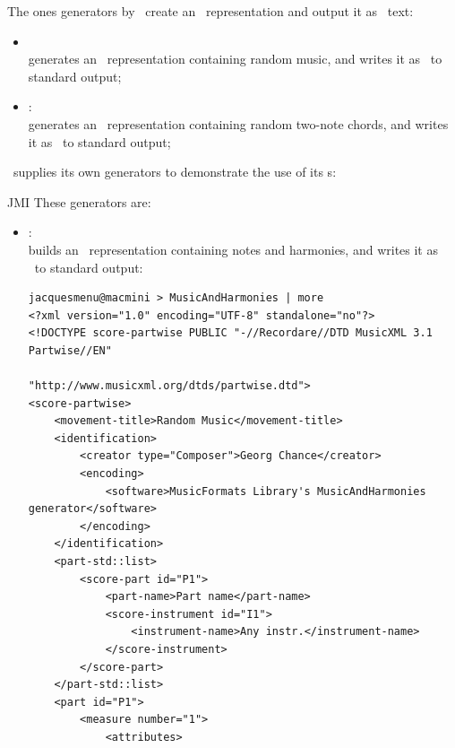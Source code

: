 The ones generators by \libmusicxml\ create an \mxsrRepr\ representation and output it as \mxml\ text:
\begin{itemize}
\item {} \\
generates an \mxsrRepr\ representation containing random music, and writes it as \mxml\ to standard output;

\item {}:\\
generates an \mxsrRepr\ representation containing random two-note chords, and writes it as \mxml\ to standard output;
\end{itemize}

\mf\ supplies its own generators to demonstrate the use of its \API s:
%
\begin{itemize}JMI
%
These generators are:
\begin{itemize}
\item {}: \\
builds an \mxsrRepr\ representation containing notes and harmonies, and writes it as \mxml\ to standard output:
\begin{lstlisting}[language=MusicXML]
jacquesmenu@macmini > MusicAndHarmonies | more
<?xml version="1.0" encoding="UTF-8" standalone="no"?>
<!DOCTYPE score-partwise PUBLIC "-//Recordare//DTD MusicXML 3.1 Partwise//EN"
                        "http://www.musicxml.org/dtds/partwise.dtd">
<score-partwise>
    <movement-title>Random Music</movement-title>
    <identification>
        <creator type="Composer">Georg Chance</creator>
        <encoding>
            <software>MusicFormats Library's MusicAndHarmonies generator</software>
        </encoding>
    </identification>
    <part-std::list>
        <score-part id="P1">
            <part-name>Part name</part-name>
            <score-instrument id="I1">
                <instrument-name>Any instr.</instrument-name>
            </score-instrument>
        </score-part>
    </part-std::list>
    <part id="P1">
        <measure number="1">
            <attributes>

\end{lstlisting}
\end{itemize}
\end{itemize}

